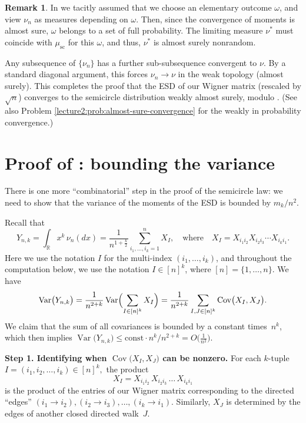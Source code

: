 \documentclass[letterpaper,11pt,oneside,reqno]{book}
\numberwithin{equation}{chapter}  %
\theoremstyle{definition}
\newtheorem{remark}[proposition]{Remark}
\begin{document}
\begin{remark}
	In 
	we tacitly assumed that we choose an elementary outcome $\omega$,
	and view $\nu_n$ as measures depending on $\omega$.
	Then, since the convergence of moments is almost sure,
	$\omega$ belongs to a set of full probability.
	The limiting measure $\nu^*$ must coincide
	with $\mu_{\mathrm{sc}}$ for this $\omega$,
	and thus, $\nu^*$ is almost surely nonrandom.
\end{remark}

Any subsequence of \(\{\nu_n\}\) has a further
sub-subsequence convergent to \(\nu\).  By a standard
diagonal argument, this forces \(\nu_n\to\nu\) in the weak
topology (almost surely).  This completes the proof that the ESD of our
Wigner matrix (rescaled by \(\sqrt{n}\)) converges to the
semicircle distribution weakly almost surely,
modulo .
(See also Problem \ref{lecture2:prob:almost-sure-convergence}
for the weakly in probability convergence.)


\section{Proof of : bounding the variance}
\label{lecture2:sub:variance-bound-proof}

There is one more ``combinatorial'' step in the proof of the
semicircle law: we need to show that the variance of the
moments of the ESD is bounded by \(m_k/n^2\).

Recall that
\[
	Y_{n,k}
	=\int_{\mathbb{R}}x^k\,\nu_n(dx)
	=\frac{1}{n^{1+\frac{k}{2}}}
	\sum_{i_1,\ldots,i_k=1}^{n} X_I,
	\quad
	\text{where}
	\quad
	X_I=X_{i_1 i_2}X_{i_2 i_3}\cdots X_{i_{k}i_1}.
\]
Here we use the notation $I$ for the multi-index $(i_1,\ldots,i_k)$,
and throughout the computation below,
we use the notation $I\in[n]^k$,
where $[n]=\{1,\ldots,n\}$.
We have
\[
\operatorname{\mathrm{Var}}\bigl(Y_{n,k}\bigr)
	=
	\frac{1}{n^{2+k}}
	\operatorname{\mathrm{Var}}
	\Bigl(\sum_{I\in[n]^k}X_I\Bigr)
	=
	\frac{1}{n^{2+k}}
	\sum_{I,J\in[n]^k}
	\operatorname{\mathrm{Cov}}\bigl(X_I,X_J\bigr).
\]
We claim that the sum of all covariances is bounded by a constant times~\(n^k\), which then implies
\(\operatorname{\mathrm{Var}}\bigl(Y_{n,k}\bigr)\le \mathrm{const}\cdot n^k / n^{2+k}=O\bigl(\tfrac{1}{n^2}\bigr)\).

\medskip

\noindent
\textbf{Step 1. Identifying when \(\operatorname{\mathrm{Cov}}\bigl(X_I,X_J\bigr)\) can be nonzero.}
For each \(k\)-tuple \(I=(i_1,i_2,\dots,i_k)\in[n]^k,\) the product
\[
	X_I = X_{i_1i_2}\,X_{i_2i_3}\,\dots \,X_{i_k i_1}
\]
is the product of the entries of our Wigner matrix corresponding to the directed ``edges''
\((i_1 \to i_2), (i_2 \to i_3),\dots,(i_k \to i_1)\).
Similarly, \(X_J\) is determined by the edges of another closed directed walk~\(J\).
\end{document}
